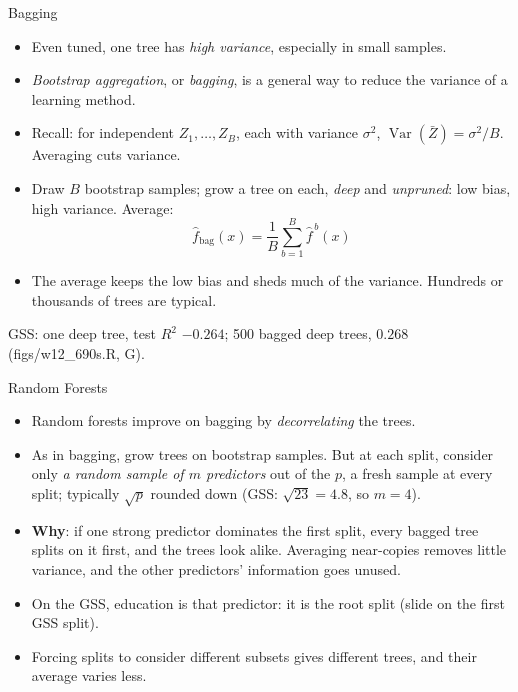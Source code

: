 \documentclass[aspectratio=169,11pt,xcolor=dvipsnames]{beamer}
\newcommand{\srcp}[1]{{\scriptsize\color{gray}(#1)}}
\DeclareMathOperator{\Var}{Var}
\newcommand{\core}{\,\raisebox{0.6pt}{\textcolor{corestar}{$\bigstar$}}}
\begin{document}
\begin{frame}{Bagging\core}
\begin{itemize}\itemsep4pt
  \item Even tuned, one tree has \textit{high variance}, especially in small samples.
  \item \textit{Bootstrap aggregation}, or \textit{bagging}, is a general way to
        reduce the variance of a learning method.
  \item Recall: for independent $Z_1, \dots, Z_B$, each with variance $\sigma^2$,
        $\Var(\bar Z) = \sigma^2/B$. Averaging cuts variance.
  \item Draw $B$ bootstrap samples; grow a tree on each, \emph{deep} and
        \emph{unpruned}: low bias, high variance. Average:
  \[
    \hat f_{\text{bag}}(x) = \frac1B\sum_{b=1}^B \hat f^{\,b}(x)
  \]
  \item The average keeps the low bias and sheds much of the variance. Hundreds or
        thousands of trees are typical.
\end{itemize}
\vskip2pt
{\footnotesize GSS: one deep tree, test $R^2$ $-0.264$; 500 bagged deep trees, $0.268$
\srcp{figs/w12\_690s.R, G}.}
\end{frame}

\begin{frame}{Random Forests\core}
\begin{itemize}\itemsep4pt
  \item Random forests improve on bagging by \textit{decorrelating} the trees.
  \item As in bagging, grow trees on bootstrap samples. But at each split, consider
        only \textit{a random sample of $m$ predictors} out of the $p$, a fresh
        sample at every split; typically $\sqrt p$ rounded down (GSS: $\sqrt{23} = 4.8$, so $m = 4$).
  \item \textbf{Why}: if one strong predictor dominates the first split, every
        bagged tree splits on it first, and the trees look alike. Averaging
        near-copies removes little variance, and the other predictors' information
        goes unused.
  \item On the GSS, education is that predictor: it is the root split
        (slide on the first GSS split).
  \item Forcing splits to consider different subsets gives different trees, and their
        average varies less.
\end{itemize}
\end{frame}
\end{document}
